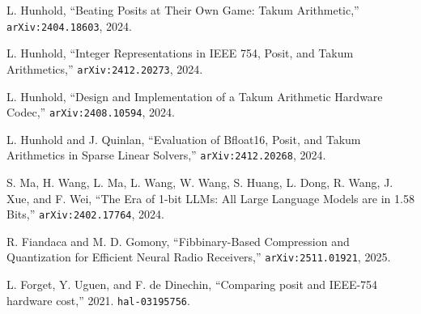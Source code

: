%



 L. Hunhold, ``Beating Posits at Their Own Game: Takum Arithmetic,''
  \texttt{arXiv:2404.18603}, 2024.

 L. Hunhold, ``Integer Representations in IEEE 754, Posit, and Takum Arithmetics,''
  \texttt{arXiv:2412.20273}, 2024.

 L. Hunhold, ``Design and Implementation of a Takum Arithmetic Hardware Codec,''
  \texttt{arXiv:2408.10594}, 2024.

 L. Hunhold and J. Quinlan, ``Evaluation of Bfloat16, Posit, and Takum Arithmetics in Sparse Linear Solvers,''
  \texttt{arXiv:2412.20268}, 2024.

 S. Ma, H. Wang, L. Ma, L. Wang, W. Wang, S. Huang, L. Dong, R. Wang, J. Xue, and F. Wei, ``The Era of 1-bit LLMs: All Large Language Models are in 1.58 Bits,''
  \texttt{arXiv:2402.17764}, 2024.

 R. Fiandaca and M. D. Gomony, ``Fibbinary-Based Compression and Quantization for Efficient Neural Radio Receivers,''
  \texttt{arXiv:2511.01921}, 2025.

 L. Forget, Y. Uguen, and F. de Dinechin, ``Comparing posit and
  IEEE-754 hardware cost,'' 2021. \texttt{hal-03195756}.

